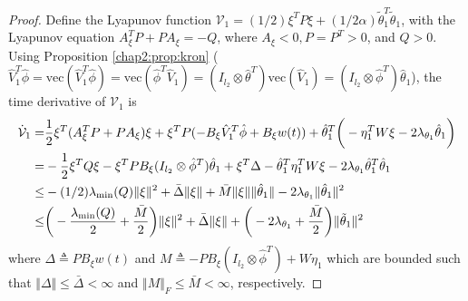 \begin{proof}
Define the Lyapunov function $\mathcal V_1=(1/2)\xi^TP\xi+(1/2\alpha)\tilde\theta_1^T\tilde\theta_1$, with the Lyapunov equation $A_\xi^TP+PA_\xi=-Q$, where $A_\xi<0,P=P^T>0$, and $Q>0$.
Using Proposition \ref{chap2:prop:kron} (\ie $\hat V_1^T\hat\phi = \text{vec}(\hat V_1^T\hat\phi)=\text{vec}(\hat\phi^T\hat V_1) = (I_{l_2}\otimes \hat\theta^T)\text{vec}(\hat V_1)=(I_{l_2}\otimes \hat\phi^T)\hat\theta_1$), the time derivative of $\mathcal V_1$ is
\begin{equation}
    \begin{aligned}
        \dot {\mathcal V}_1 =& {1\over 2}\xi^T(A_\xi^TP+PA_\xi)\xi+\xi ^TP ( -B_\xi\hat V_1^T\hat \phi   +B_\xi w(t) )+\hat\theta_1^T
        \bigg(
            -\eta_1^TW \xi-2\lambda_{\theta_1} \hat\theta_1 
        \bigg)
        \\
        =& -{1\over 2}\xi^TQ\xi -\xi^TPB_\xi(I_{l_2}\otimes \hat\phi^T)\hat\theta_1 +\xi^T\Delta
        -\hat\theta_1^T\eta_1^TW\xi
        -2\lambda_{\theta_1} \hat\theta_1^T\hat\theta_1
        \\
        \le& -(1/2)\lambda_\text{min}(Q)\Vert \xi\Vert ^2
        +\bar\Delta \Vert \xi\Vert  
        +\bar M\Vert \xi\Vert  \Vert \hat\theta_1\Vert
        -2\lambda_{\theta_1}
        \Vert\hat\theta_1\Vert ^2
        \\
        \le& 
        \bigg(
        -{\lambda_\text{min}(Q)\over 2} +{\bar M\over 2}
        \bigg)
        \Vert \xi\Vert ^2 +\bar\Delta \Vert \xi\Vert  
        + 
        \bigg(
        -2\lambda_{\theta_1} 
        +{\bar M\over 2}
        \bigg)
        \Vert \tilde\theta_1\Vert ^2 
        \end{aligned}
        \label{chap3:eq:V1_dot}
\end{equation}
where $\Delta\triangleq PB_\xi w(t)$ and $M\triangleq  -PB_\xi(I_{l_2}\otimes \hat\phi^T)+W\eta_1$ which are bounded such that $\Vert\Delta\Vert\le\bar\Delta<\infty$ and $\Vert M\Vert_F\le \bar M< \infty$, respectively.


\end{proof}
